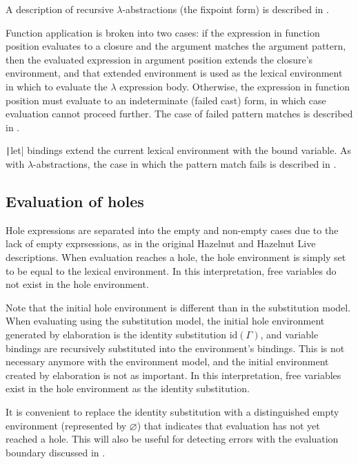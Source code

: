 A description of recursive $\lambda$-abstractions (the fixpoint form) is described in .

Function application is broken into two cases: if the expression in function position evaluates to a closure and the argument matches the argument pattern, then the evaluated expression in argument position extends the closure's environment, and that extended environment is used as the lexical environment in which to evaluate the $\lambda$ expression body. Otherwise, the expression in function position must evaluate to an indeterminate (failed cast) form, in which case evaluation cannot proceed further. The case of failed pattern matches is described in .


\texttt|let| bindings extend the current lexical environment with the bound variable. As with $\lambda$-abstractions, the case in which the pattern match fails is described in .

\subsection{Evaluation of holes}
\label{sec:holeenv_evalenv_connection}

Hole expressions are separated into the empty and non-empty cases due to the lack of empty exprsessions, as in the original Hazelnut and Hazelnut Live descriptions. When evaluation reaches a hole, the hole environment is simply set to be equal to the lexical environment. In this interpretation, free variables do not exist in the hole environment.

Note that the initial hole environment is different than in the substitution model. When evaluating using the substitution model, the initial hole environment generated by elaboration is the identity substitution $\text{id}({\Gamma})$, and variable bindings are recursively substituted into the environment's bindings. This is not necessary anymore with the environment model, and the initial environment created by elaboration is not as important. In this interpretation, free variables exist in the hole environment as the identity substitution.

It is convenient to replace the identity substitution with a distinguished empty environment (represented by $\varnothing$) that indicates that evaluation has not yet reached a hole. This will also be useful for detecting errors with the evaluation boundary discussed in .

